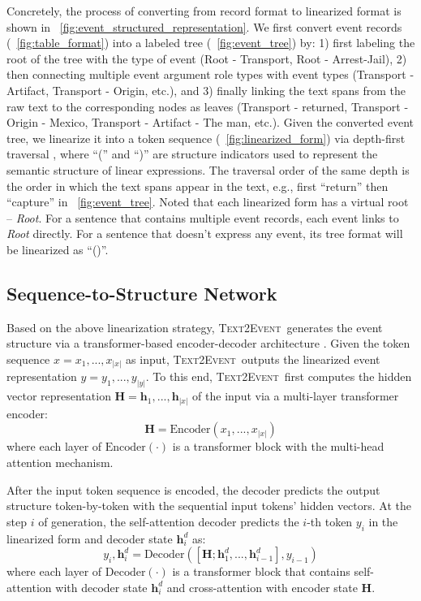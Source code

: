 \documentclass[11pt,a4paper]{article}
\newcommand\modelname{\textsc{Text2Event}}
\begin{document}
Concretely, the process of converting from record format to linearized format is shown in \figurename~\ref{fig:event_structured_representation}.
We first convert event records (\figurename~\ref{fig:table_format}) into a labeled tree (\figurename~\ref{fig:event_tree}) by:
1) first labeling the root of the tree with the type of event (Root - Transport, Root - Arrest-Jail),
2) then connecting multiple event argument role types with event types (Transport - Artifact, Transport - Origin, etc.),
and 3) finally linking the text spans from the raw text to the corresponding nodes as leaves (Transport - returned, Transport - Origin - Mexico, Transport - Artifact - The man, etc.).
Given the converted event tree, we linearize it into a token sequence (\figurename~\ref{fig:linearized_form}) via depth-first traversal \citep{NIPS2015_277281aa}, where ``('' and ``)'' are structure indicators used to represent the semantic structure of linear expressions.
The traversal order of the same depth is the order in which the text spans appear in the text, e.g., first ``return'' then ``capture'' in \figurename~\ref{fig:event_tree}.
Noted that each linearized form has a virtual root -- \textit{Root}.
For a sentence that contains multiple event records, each event links to \textit{Root} directly.
For a sentence that doesn't express any event, its tree format will be linearized as ``()''.

\subsection{Sequence-to-Structure Network}\label{sec:seq-to-structure}

Based on the above linearization strategy, \modelname\, generates the event structure via a transformer-based encoder-decoder architecture \citep{NIPS2017_3f5ee243}.
Given the token sequence $x=x_{1}, ..., x_{|x|}$ as input, \modelname\, outputs the linearized event representation $y=y_{1}, ..., y_{|y|}$.
To this end, \modelname\, first computes the hidden vector representation $\mathbf{H}=\mathbf{h}_{1},...,\mathbf{h}_{|x|}$ of the input via a multi-layer transformer encoder: 
\begin{equation} \label{equ:encoder}
    \mathbf{H} = \text{Encoder} (x_{1}, ..., x_{|x|})
\end{equation}
where each layer of $\text{Encoder}(\cdot)$ is a transformer block with the multi-head attention mechanism.

After the input token sequence is encoded, the decoder predicts the output structure token-by-token with the sequential input tokens' hidden vectors.
At the step $i$ of generation, the self-attention decoder predicts the $i$-th token $y_{i}$ in the linearized form and decoder state $\mathbf{h}^{d}_{i}$ as:
\begin{equation} \label{equ:decoder}
    y_{i}, \mathbf{h}^{d}_{i} = \text{Decoder}([\mathbf{H}; \mathbf{h}^{d}_{1},...,\mathbf{h}^{d}_{i-1}], y_{i-1})
\end{equation}
where each layer of $\text{Decoder}(\cdot)$ is a transformer block that contains self-attention with decoder state $\mathbf{h}^{d}_{i}$ and cross-attention with encoder state $\mathbf{H}$.
\end{document}
